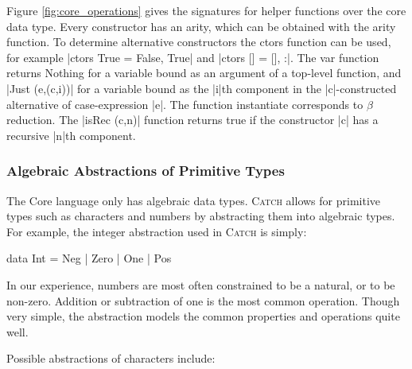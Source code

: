 \documentclass[preprint]{sigplanconf}
\newcommand{\C}[1]{\textsf{#1}}
\newcommand{\catch}{\textsc{Catch}}
\begin{document}
Figure \ref{fig:core_operations} gives the signatures for helper functions over the core data type. Every constructor has an arity, which can be obtained with the \C{arity} function. To determine alternative constructors the \C{ctors} function can be used, for example |ctors True = {False, True}| and |ctors [] = {[], :}|. The \C{var} function returns \C{Nothing} for a variable bound as an argument of a top-level function, and |Just (e,(c,i))| for a variable bound as the |i|th component in the |c|-constructed alternative of case-expression |e|. The function \C{instantiate} corresponds to $\beta$ reduction. The |isRec (c,n)| function returns true if the constructor |c| has a recursive |n|th component.

\subsubsection{Algebraic Abstractions of Primitive Types}
\label{sec:abstraction}

\begin{comment}
Natural numbers are often encoded by Peano numerals, and this idea can easily be extended to integers:

\begin{code}
data Pos  = One | Succ Pos
data Int  = Minus Pos | Zero | Plus Pos
\end{code}

Although this abstraction of \C{Int} captures all the underlying detail of the number system, the underlying constraint systems discussed in \S\ref{sec:constraint} would be unable to distinguishing between any pair of numbers both greater than 2, or both less than -2.
\end{comment}

The Core language only has algebraic data types. \catch{} allows for primitive types such as characters and numbers by abstracting them into algebraic types. For example, the integer abstraction used in \catch{} is simply:

\begin{code}
data Int = Neg | Zero | One | Pos
\end{code}

In our experience, numbers are most often constrained to be a natural, or to be non-zero. Addition or subtraction of one is the most common operation. Though very simple, the abstraction models the common properties and operations quite well.

Possible abstractions of characters include:
\end{document}
